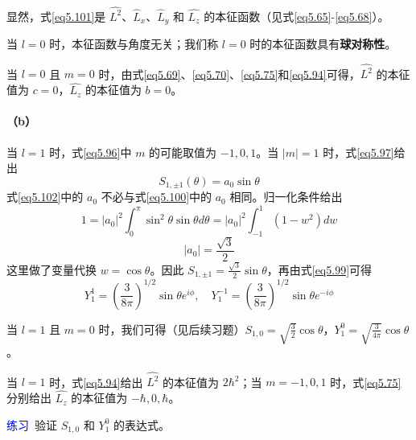 \documentclass[12pt,a4paper,openany]{ctexbook}
\begin{document}
\begin{flushleft}
\begin{examplebox}
显然，式\eqref{eq5.101}是 \(\hat{L^2}\)、\(\hat{L}_x\)、\(\hat{L}_y\) 和 \(\hat{L_z}\) 的本征函数（见式\eqref{eq5.65}-\eqref{eq5.68}）。

当 \(l=0\) 时，本征函数与角度无关；我们称 \(l=0\) 时的本征函数具有\textbf{球对称性}。

当 \(l=0\) 且 \(m=0\) 时，由式\eqref{eq5.69}、\eqref{eq5.70}、\eqref{eq5.75}和\eqref{eq5.94}可得，\(\hat{L^2}\) 的本征值为 \(c=0\)，\(\hat{L_z}\) 的本征值为 \(b=0\)。

\paragraph{（b）} 当 \(l=1\) 时，式\eqref{eq5.96}中 \(m\) 的可能取值为 \(-1,0,1\)。当 \(|m|=1\) 时，式\eqref{eq5.97}给出
\begin{equation}
    S_{1,\pm1}(\theta) = a_0 \sin\theta \label{eq5.102}
\end{equation}
式\eqref{eq5.102}中的 \(a_0\) 不必与式\eqref{eq5.100}中的 \(a_0\) 相同。归一化条件给出
\[
1 = |a_0|^2 \int_0^\pi \sin^2\theta \sin\theta d\theta = |a_0|^2 \int_{-1}^1 (1-w^2) dw
\]
\[
|a_0| = \frac{\sqrt{3}}{2}
\]
这里做了变量代换 \(w = \cos\theta\)。因此 \(S_{1,\pm1} = \frac{\sqrt{3}}{2}\sin\theta\)，再由式\eqref{eq5.99}可得
\begin{equation}
    Y_1^1 = \left(\frac{3}{8\pi}\right)^{1/2} \sin\theta e^{i\phi}, \quad Y_1^{-1} = \left(\frac{3}{8\pi}\right)^{1/2} \sin\theta e^{-i\phi} \label{eq5.103}
\end{equation}

当 \(l=1\) 且 \(m=0\) 时，我们可得（见后续习题）\(S_{1,0} = \sqrt{\frac{3}{2}}\cos\theta\)，\(Y_1^0 = \sqrt{\frac{3}{4\pi}}\cos\theta\)。

当 \(l=1\) 时，式\eqref{eq5.94}给出 \(\hat{L^2}\) 的本征值为 \(2\hbar^2\)；当 \(m=-1,0,1\) 时，式\eqref{eq5.75}分别给出 \(\hat{L_z}\) 的本征值为 \(-\hbar,0,\hbar\)。

\textcolor{blue}{\large 练习}\ 验证 \(S_{1,0}\) 和 \(Y_1^0\) 的表达式。
\end{examplebox}
    

\end{flushleft}
\end{document}
